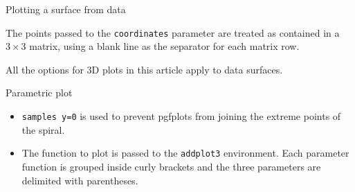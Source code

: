 \documentclass{beamer}
\begin{document}
		\begin{frame}{Plotting a surface from data}
		    
		    The points passed to the \texttt{coordinates} parameter are treated as contained in a $3 \times 3$ matrix, using a blank line as the separator for each matrix row.
		
		    All the options for 3D plots in this article apply to data surfaces.
		    
		\end{frame}

\begin{frame}{Parametric plot}
   
    \begin{itemize}
        \item \texttt{samples y=0} is used to prevent pgfplots from joining the extreme points of the spiral.
        \item The function to plot is passed to the \texttt{addplot3} environment. Each parameter function is grouped inside curly brackets and the three parameters are delimited with parentheses.
    \end{itemize}
    
\end{frame}
\end{document}
